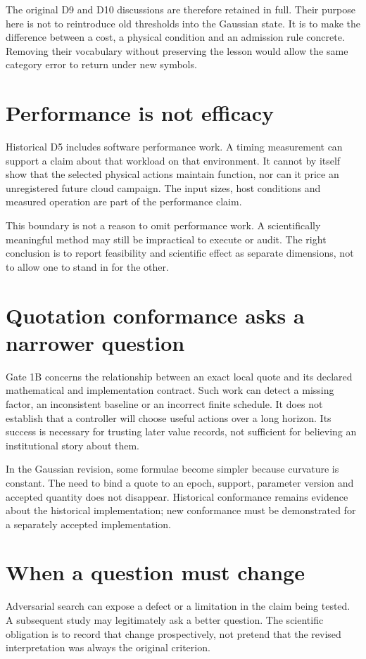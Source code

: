 The original D9 and D10 discussions are therefore retained in full. Their
purpose here is not to reintroduce old thresholds into the Gaussian state.
It is to make the difference between a cost, a physical condition and an
admission rule concrete. Removing their vocabulary without preserving the
lesson would allow the same category error to return under new symbols.

\section{Performance is not efficacy}
Historical D5 includes software performance work. A timing measurement can
support a claim about that workload on that environment. It cannot by itself
show that the selected physical actions maintain function, nor can it price
an unregistered future cloud campaign. The input sizes, host conditions and
measured operation are part of the performance claim.

This boundary is not a reason to omit performance work. A scientifically
meaningful method may still be impractical to execute or audit. The right
conclusion is to report feasibility and scientific effect as separate
dimensions, not to allow one to stand in for the other.

\section{Quotation conformance asks a narrower question}
Gate 1B concerns the relationship between an exact local quote and its
declared mathematical and implementation contract. Such work can detect a
missing factor, an inconsistent baseline or an incorrect finite schedule.
It does not establish that a controller will choose useful actions over a
long horizon. Its success is necessary for trusting later value records,
not sufficient for believing an institutional story about them.

In the Gaussian revision, some formulae become simpler because curvature
is constant. The need to bind a quote to an epoch, support, parameter
version and accepted quantity does not disappear. Historical conformance
remains evidence about the historical implementation; new conformance must
be demonstrated for a separately accepted implementation.

\section{When a question must change}
Adversarial search can expose a defect or a limitation in the claim being
tested. A subsequent study may legitimately ask a better question. The
scientific obligation is to record that change prospectively, not pretend
that the revised interpretation was always the original criterion.

